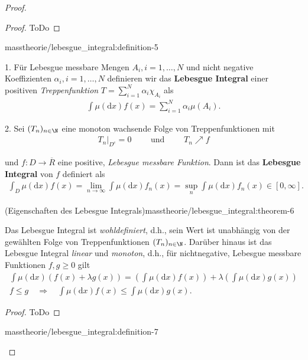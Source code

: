 \documentclass[letterpaper,10pt,english]{jupyterBook}
\begin{document}
\begin{proof}
\begin{proof}
 ToDo
\end{proof}
\begin{definition}{}{masstheorie/lebesgue_integral:definition-5}



\par
1. Für Lebesgue messbare Mengen \(A_i, i=1,\ldots,N\) und nicht negative Koeffizienten \(\alpha_i, i=1,\ldots,N\) definieren wir das \textbf{Lebesgue Integral} einer positiven \emph{Treppenfunktion} \(T = \sum_{i=1}^N \alpha_i \chi_{A_i}\) als
\begin{align*}
\int \mu(\mathrm{d}x) f(x) = \sum_{i=1}^N \alpha_i \mu(A_i).
\end{align*}
\par
2. Sei \((T_n)_{n\in\N}\) eine monoton wachsende Folge von Treppenfunktionen mit
\begin{align*}
T_n|_{D^c} = 0 \qquad \text{ und } \qquad T_n \nearrow f
\end{align*}
\par
und \(f \colon D \rightarrow \overline{R}\) eine positive, \emph{Lebesgue messbare Funktion}.
Dann ist das \textbf{Lebesgue Integral} von \(f\) definiert als
\begin{align*}
\int_D \mu(\mathrm{d}x) f(x) = \lim_{n\rightarrow \infty} \int \mu(\mathrm{d}x) f_n(x) = \sup_n \int \mu(\mathrm{d}x) f_n(x) \in [0,\infty].
\end{align*}\end{definition}
\begin{theorem}{(Eigenschaften des Lebesgue Integrals)}{masstheorie/lebesgue_integral:theorem-6}



\par
Das Lebesgue Integral ist \emph{wohldefiniert}, d.h., sein Wert ist unabhängig von der gewählten Folge von Treppenfunktionen \((T_n)_{n\in\N}\).
Darüber hinaus ist das Lebesgue Integral \emph{linear} und \emph{monoton}, d.h., für nichtnegative, Lebesgue messbare Funktionen \(f,g \geq 0\) gilt
\begin{align*}
\int \mu(\mathrm{d}x)(f(x) + \lambda g(x)) = \left( \int \mu(\mathrm{d}x) f(x) \right) + \lambda \left( \int \mu(\mathrm{d}x) g(x) \right)\\
f \leq g \quad \Rightarrow \quad \int \mu(\mathrm{d}x) f(x) \leq \int \mu(\mathrm{d}x) g(x).
\end{align*}\end{theorem}

\begin{proof}
 ToDo
\end{proof}
\begin{definition}{}{masstheorie/lebesgue_integral:definition-7}




\end{definition}
\end{proof}
\end{document}

